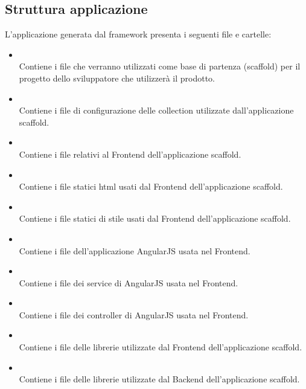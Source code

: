 \subsection{Struttura applicazione}

L'applicazione generata dal framework presenta i seguenti file e cartelle: 
\begin{itemize}
 \item \textbf{} \\
	Contiene i file che verranno utilizzati come base di partenza (scaffold) per il progetto dello sviluppatore che utilizzerà il prodotto.

 \item \textbf{} \\
	Contiene i file di configurazione delle collection utilizzate dall'applicazione scaffold.

 \item \textbf{} \\
	Contiene i file relativi al Frontend dell'applicazione scaffold.

 \item \textbf{} \\
	Contiene i file statici html usati dal Frontend dell'applicazione scaffold.

 \item \textbf{} \\
	Contiene i file statici di stile usati dal Frontend dell'applicazione scaffold.

 \item \textbf{} \\
	Contiene i file dell'applicazione AngularJS usata nel Frontend.

 \item \textbf{} \\
	Contiene i file dei service di AngularJS usata nel Frontend.

 \item \textbf{} \\
	Contiene i file dei controller di AngularJS usata nel Frontend.

 \item \textbf{} \\
	Contiene i file delle librerie utilizzate dal Frontend dell'applicazione scaffold.
	
 \item \textbf{} \\
	Contiene i file delle librerie utilizzate dal Backend dell'applicazione scaffold.
\end{itemize}
